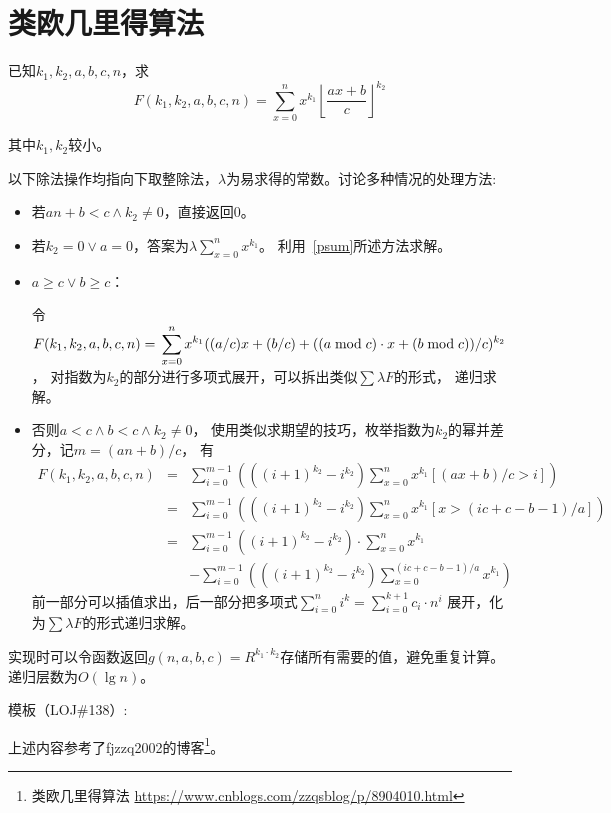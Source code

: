 \section{类欧几里得算法}
已知$k_1,k_2,a,b,c,n$，求
\begin{displaymath}
    F(k_1,k_2,a,b,c,n)=\sum_{x=0}^n{x^{k_1}
    {\left \lfloor\frac{ax+b}{c}\right \rfloor}^{k_2}}
\end{displaymath}

其中$k_1,k_2$较小。

以下除法操作均指向下取整除法，$\lambda$为易求得的常数。讨论多种情况的处理方法:
\begin{itemize}
    \item 若$an+b<c \wedge k_2\neq 0$，直接返回0。
    \item 若$k_2=0 \vee a=0$，答案为$\lambda \displaystyle \sum_{x=0}^n{x^{k_1}}$。
    利用~\ref{psum}所述方法求解。
    \item $a\geq c \vee b\geq c$：

    令$\displaystyle F(k_1,k_2,a,b,c,n)=\\\sum_{x=0}^n{x^{k_1}
    ((a/c)x+(b/c)+((a \bmod c) \cdot x+(b\bmod c))/c)^{k_2}}$，
    对指数为$k_2$的部分进行多项式展开，可以拆出类似$\sum{\lambda F}$的形式，
    递归求解。

    \item 否则$a<c \wedge b<c \wedge k_2 \neq 0$，
    使用类似求期望的技巧，枚举指数为$k_2$的幂并差分，记$m=(an+b)/c$，
    有\begin{eqnarray*}
        F(k_1,k_2,a,b,c,n)&=&\sum_{i=0}^{m-1}{\left(
            ((i+1)^{k_2}-i^{k_2})\sum_{x=0}^n{
                x^{k_1}[(ax+b)/c>i]
            }
        \right)}\\
        &=&\sum_{i=0}^{m-1}{\left(
            ((i+1)^{k_2}-i^{k_2})\sum_{x=0}^n{
                x^{k_1}[x>(ic+c-b-1)/a]
            }
        \right)}\\
        &=&\sum_{i=0}^{m-1}{((i+1)^{k_2}-i^{k_2})}
        \cdot \sum_{x=0}^n{x^{k_1}}\\
        & &-\sum_{i=0}^{m-1}{\left(
            ((i+1)^{k_2}-i^{k_2})\sum_{x=0}^{(ic+c-b-1)/a}{
                x^{k_1}
            }
        \right)}
    \end{eqnarray*}
    前一部分可以插值求出，后一部分把多项式$\displaystyle \sum_{i=0}^n{i^k}=
    \sum_{i=0}^{k+1}{c_i\cdot n^i}$
    展开，化为$\sum{\lambda F}$的形式递归求解。
\end{itemize}

实现时可以令函数返回$g(n,a,b,c)=R^{k_1\cdot k_2}$存储所有需要的值，避免重复计算。
递归层数为$O(\lg n)$。

模板（LOJ\#138）:


上述内容参考了fjzzq2002的博客\footnote{
    类欧几里得算法
    \url{https://www.cnblogs.com/zzqsblog/p/8904010.html}
}。
